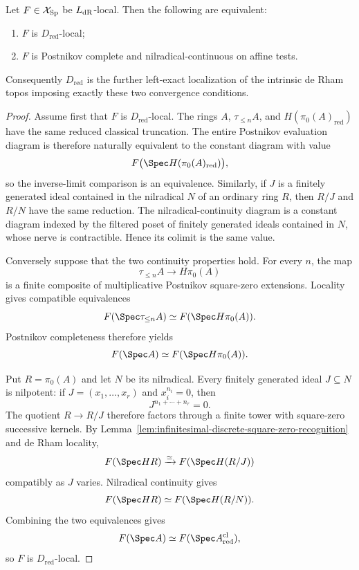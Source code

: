 \begin{theorem}
\label{thm:infinitesimal-reduced-convergence}
Let $F\in\mathcal X_{\mathrm{Sp}}$ be $L_{\mathrm{dR}}$-local.  Then the following are
equivalent:
\begin{enumerate}
\item $F$ is $D_{\mathrm{red}}$-local;
\item $F$ is Postnikov complete and nilradical-continuous on affine tests.
\end{enumerate}
Consequently $D_{\mathrm{red}}$ is the further left-exact localization of the
intrinsic de Rham topos imposing exactly these two convergence conditions.
\end{theorem}

\begin{proof}
Assume first that $F$ is $D_{\mathrm{red}}$-local.  The rings $A$,
$\tau_{\leq n}A$, and $H(\pi_0(A)_{\mathrm{red}})$ have the same reduced
classical truncation.  The entire Postnikov evaluation diagram is therefore
naturally equivalent to the constant diagram with value
\[
    F\bigl(\Spec H(\pi_0(A)_{\mathrm{red}})\bigr),
\]
so the inverse-limit comparison is an equivalence.  Similarly, if $J$ is a
finitely generated ideal contained in the nilradical $N$ of an ordinary ring
$R$, then $R/J$ and $R/N$ have the same reduction.  The
nilradical-continuity diagram is a constant diagram indexed by the filtered
poset of finitely generated ideals contained in $N$, whose nerve is
contractible.  Hence its colimit is the same value.

Conversely suppose that the two continuity properties hold.  For every $n$,
the map
\[
    \tau_{\leq n}A\longrightarrow H\pi_0(A)
\]
is a finite composite of multiplicative Postnikov square-zero extensions.
Locality gives compatible equivalences
\[
    F(\Spec\tau_{\leq n}A)
    \simeq
    F(\Spec H\pi_0(A)).
\]
Postnikov completeness therefore yields
\[
    F(\Spec A)
    \simeq
    F(\Spec H\pi_0(A)).
\]

Put $R=\pi_0(A)$ and let $N$ be its nilradical.  Every finitely generated
ideal $J\subseteq N$ is nilpotent: if $J=(x_1,\ldots,x_r)$ and
$x_i^{n_i}=0$, then
\[
    J^{n_1+\cdots+n_r}=0.
\]
The quotient $R\to R/J$ therefore factors through a finite tower with
square-zero successive kernels.  By
Lemma~\ref{lem:infinitesimal-discrete-square-zero-recognition} and de Rham
locality,
\[
    F(\Spec HR)
    \xrightarrow{\simeq}
    F(\Spec H(R/J))
\]
compatibly as $J$ varies.  Nilradical continuity gives
\[
    F(\Spec HR)
    \simeq
    F(\Spec H(R/N)).
\]
Combining the two equivalences gives
\[
    F(\Spec A)
    \simeq
    F(\Spec A_{\mathrm{red}}^{\mathrm{cl}}),
\]
so $F$ is $D_{\mathrm{red}}$-local.
\end{proof}


